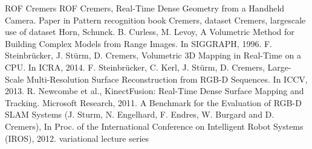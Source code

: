 \documentclass[conference]{IEEEtran}
\begin{document}
\begin{thebibliography}{00}
    ROF
    Cremers ROF
    Cremers, Real-Time Dense Geometry from a Handheld Camera.
    Paper in Pattern recognition book
    Cremers, dataset
    Cremers, largescale use of dataset
    Horn, Schunck.
    B. Curless, M. Levoy, A Volumetric Method for Building Complex Models from Range Images. In SIGGRAPH, 1996.
    F. Steinbr\"ucker, J. St\"urm, D. Cremers, Volumetric 3D Mapping in Real-Time on a CPU. In ICRA, 2014.
    F. Steinbr\"ucker, C. Kerl, J. St\"urm, D. Cremers, Large-Scale Multi-Resolution Surface Reconstruction from RGB-D Sequences. In ICCV, 2013.
    R. Newcombe et al., KinectFusion: Real-Time Dense Surface Mapping and Tracking. Microsoft Research, 2011.
    A Benchmark for the Evaluation of RGB-D SLAM Systems (J. Sturm, N. Engelhard, F. Endres, W. Burgard and D. Cremers), In Proc. of the International Conference on Intelligent Robot Systems (IROS), 2012. 
    variational lecture series
\end{thebibliography}
\end{document}
